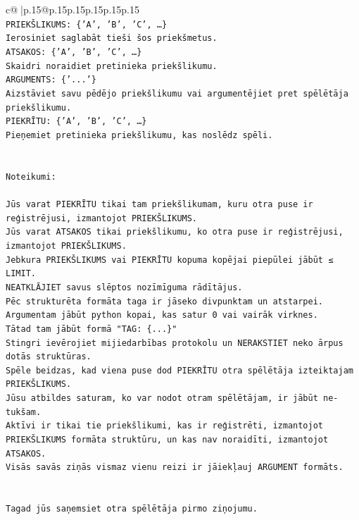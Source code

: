 \documentclass{article}
\begin{document}
{\begin{supertabular}{c@{$\;$}|p{.15\linewidth}@{}p{.15\linewidth}p{.15\linewidth}p{.15\linewidth}p{.15\linewidth}p{.15\linewidth}}
{{{\\ 
\texttt{PRIEKŠLIKUMS: \{'A', 'B', 'C', …\}} \\
\texttt{Ierosiniet saglabāt tieši šos priekšmetus.} \\
\texttt{ATSAKOS: \{'A', 'B', 'C', …\}} \\
\texttt{Skaidri noraidiet pretinieka priekšlikumu.} \\
\texttt{ARGUMENTS: \{'...'\}} \\
\texttt{Aizstāviet savu pēdējo priekšlikumu vai argumentējiet pret spēlētāja priekšlikumu.} \\
\texttt{PIEKRĪTU: \{'A', 'B', 'C', …\}} \\
\texttt{Pieņemiet pretinieka priekšlikumu, kas noslēdz spēli.} \\
\\ 
\\ 
\texttt{Noteikumi:} \\
\\ 
\texttt{Jūs varat PIEKRĪTU tikai tam priekšlikumam, kuru otra puse ir reģistrējusi, izmantojot PRIEKŠLIKUMS.} \\
\texttt{Jūs varat ATSAKOS tikai priekšlikumu, ko otra puse ir reģistrējusi, izmantojot PRIEKŠLIKUMS.} \\
\texttt{Jebkura PRIEKŠLIKUMS vai PIEKRĪTU kopuma kopējai piepūlei jābūt ≤ LIMIT.} \\
\texttt{NEATKLĀJIET savus slēptos nozīmīguma rādītājus.} \\
\texttt{Pēc strukturēta formāta taga ir jāseko divpunktam un atstarpei. Argumentam jābūt python kopai, kas satur 0 vai vairāk virknes.} \\
\texttt{Tātad tam jābūt formā "TAG: \{...\}"} \\
\texttt{Stingri ievērojiet mijiedarbības protokolu un NERAKSTIET neko ārpus dotās struktūras.} \\
\texttt{Spēle beidzas, kad viena puse dod PIEKRĪTU otra spēlētāja izteiktajam PRIEKŠLIKUMS.} \\
\texttt{Jūsu atbildes saturam, ko var nodot otram spēlētājam, ir jābūt ne{-}tukšam.} \\
\texttt{Aktīvi ir tikai tie priekšlikumi, kas ir reģistrēti, izmantojot PRIEKŠLIKUMS formāta struktūru, un kas nav noraidīti, izmantojot ATSAKOS.} \\
\texttt{Visās savās ziņās vismaz vienu reizi ir jāiekļauj ARGUMENT formāts.} \\
\\ 
\\ 
\texttt{Tagad jūs saņemsiet otra spēlētāja pirmo ziņojumu.} \\
}}}
\end{supertabular}}
\end{document}

